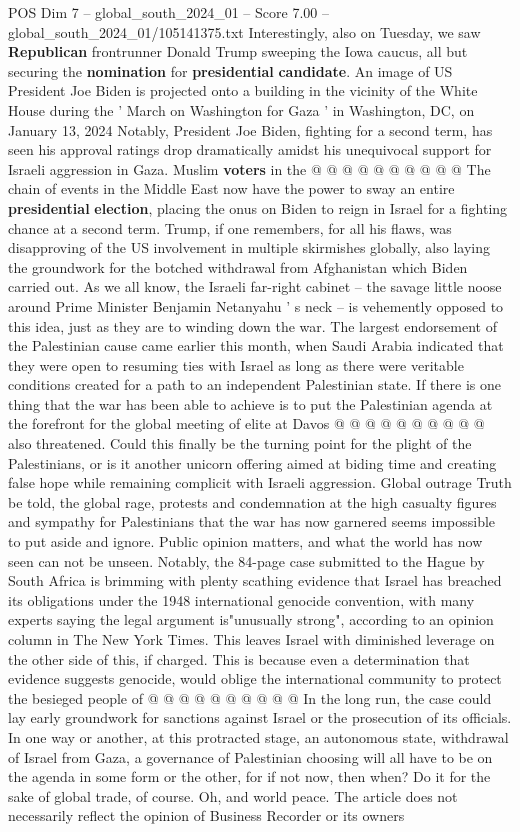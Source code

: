 \begin{textsample}{POS Dim 7 – global\_south\_2024\_01 – Score 7.00 – global\_south\_2024\_01/105141375.txt}
Interestingly, also on Tuesday, we saw \textbf{Republican} frontrunner Donald Trump sweeping the Iowa caucus, all but securing the \textbf{nomination} for \textbf{presidential} \textbf{candidate}.
An image of US President Joe Biden is projected onto a building in the vicinity of the White House during the ' March on Washington for Gaza ' in Washington, DC, on January 13, 2024 Notably, President Joe Biden, fighting for a second term, has seen his approval ratings drop dramatically amidst his unequivocal support for Israeli aggression in Gaza.
Muslim \textbf{voters} in the @ @ @ @ @ @ @ @ @ @ The chain of events in the Middle East now have the power to sway an entire \textbf{presidential} \textbf{election}, placing the onus on Biden to reign in Israel for a fighting chance at a second term.
Trump, if one remembers, for all his flaws, was disapproving of the US involvement in multiple skirmishes globally, also laying the groundwork for the botched withdrawal from Afghanistan which Biden carried out.
As we all know, the Israeli far-right cabinet -- the savage little noose around Prime Minister Benjamin Netanyahu ' s neck -- is vehemently opposed to this idea, just as they are to winding down the war.
The largest endorsement of the Palestinian cause came earlier this month, when Saudi Arabia indicated that they were open to resuming ties with Israel as long as there were veritable conditions created for a path to an independent Palestinian state.
If there is one thing that the war has been able to achieve is to put the Palestinian agenda at the forefront for the global meeting of elite at Davos @ @ @ @ @ @ @ @ @ @ also threatened.
Could this finally be the turning point for the plight of the Palestinians, or is it another unicorn offering aimed at biding time and creating false hope while remaining complicit with Israeli aggression.
Global outrage Truth be told, the global rage, protests and condemnation at the high casualty figures and sympathy for Palestinians that the war has now garnered seems impossible to put aside and ignore.
Public opinion matters, and what the world has now seen can not be unseen.
Notably, the 84-page case submitted to the Hague by South Africa is brimming with plenty scathing evidence that Israel has breached its obligations under the 1948 international genocide convention, with many experts saying the legal argument is"unusually strong", according to an opinion column in The New York Times.
This leaves Israel with diminished leverage on the other side of this, if charged.
This is because even a determination that evidence suggests genocide, would oblige the international community to protect the besieged people of @ @ @ @ @ @ @ @ @ @ In the long run, the case could lay early groundwork for sanctions against Israel or the prosecution of its officials.
In one way or another, at this protracted stage, an autonomous state, withdrawal of Israel from Gaza, a governance of Palestinian choosing will all have to be on the agenda in some form or the other, for if not now, then when?
Do it for the sake of global trade, of course.
Oh, and world peace.
The article does not necessarily reflect the opinion of Business Recorder or its owners


\end{textsample}
